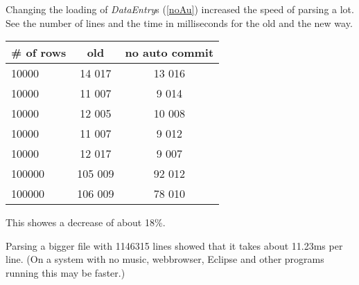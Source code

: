 Changing the loading of \textit{DataEntry}s (\ref{noAu}) increased
the speed of parsing a lot. See the number of lines and the time in milliseconds
for the old and the new way.

\begin{tabular}{l|c|c}
\# of rows & old & no auto commit \\
\hline
10000& 14 017 & 13 016\\
10000&11 007 &9 014\\
10000&12 005&10 008\\
10000&11 007&9 012\\
10000&12 017&9 007\\
100000&105 009 &92 012\\
100000&106 009 &78 010\\
\end{tabular}

This showes a decrease of about 18\%.

Parsing a bigger file with 1146315 lines showed
that it takes about 11.23ms per line. (On a system with no music, webbrowser,
Eclipse and other programs running this may be faster.)